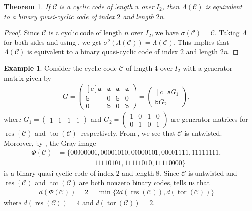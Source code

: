 \documentclass[12pt]{article}
\newtheorem{theorem}{Theorem}[section]
\theoremstyle{definition}
\newtheorem{example}[example]{Example}
\theoremstyle{plain}
\newcommand{\Blue}[1]{{ \color{blue} #1}}
\begin{document}
\begin{theorem}
If $\mathcal{C}$ is a cyclic code of length $n$ over $I_2$, then $\Lambda(\mathcal{C})$ is equivalent to a binary quasi-cyclic code of index $2$ and length $2n$.
\end{theorem}

\begin{proof}
Since $\mathcal{C}$ is a cyclic code of length $n$ over $I_2$, we have $\sigma (\mathcal{C}) = \mathcal{C}$. Taking $\Lambda$ for both sides and using  , we get $\sigma^2 ( \Lambda (\mathcal{C}) ) = \Lambda (\mathcal{C})$. This implies that $\Lambda (\mathcal{C})$ is equivalent to a binary quasi-cyclic code of index $2$ and length $2n$.
\end{proof}


\begin{example}
Consider the cyclic code $\mathcal{C}$ of length $4$ over $I_2$ with a generator matrix given by
\begin{align*}
G = \begin{pmatrix*}[c]
\mathtt{a}  &  \mathtt{a}  &  \mathtt{a}  &  \mathtt{a}  \\
\mathtt{b}  &  0  &  \mathtt{b}  &  0   \\
0  &  \mathtt{b}  &  0  &  \mathtt{b}
\end{pmatrix*}
=
\begin{pmatrix*}[c]
\mathtt{a} G_1 \\
\mathtt{b} G_2
\end{pmatrix*} ,
\end{align*}
where $G_1 = \left(
\begin{array}{cccc}
1 & 1 & 1 & 1
\end{array}
\right)$
and
$G_2 = \left(
\begin{array}{cccc}
1 & 0 & 1 & 0  \\
0 & 1 & 0 & 1
\end{array}
\right)$
are generator matrices for $\operatorname{res} ( \mathcal{C} )$ and $\operatorname{tor} ( \mathcal{C} )$, respectively. From , we see that $\mathcal{C}$ is untwisted. Moreover, by , the Gray image
\begin{align*}
\Phi ( \mathcal{C} )
&=
\{
00000000,
00001010,
00000101,
00001111,
11111111,  \\
&\phantom{====}11110101,
11111010,
11110000
\}
\end{align*}
is a binary quasi-cyclic code of index $2$ and length $8$. Since $\mathcal{C}$ is untwisted and $\operatorname{res} ( \mathcal{C} )$ and $\operatorname{tor} ( \mathcal{C} )$ are both nonzero binary codes,  tells us that
\begin{align*}
d ( \Phi ( \mathcal{C}) ) = 2 = \min \{  2 d ( \operatorname{res} ( \mathcal{C} ) ) , d ( \operatorname{tor} ( \mathcal{C}) )  \}
\end{align*}
where $d ( \operatorname{res} ( \mathcal{C} ) ) = 4$ and $d ( \operatorname{tor} ( \mathcal{C} ) ) = 2$.
\end{example}
\end{document}
